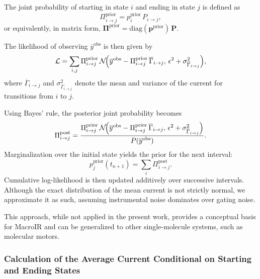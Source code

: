 \documentclass[pdflatex,sn-nature]{sn-jnl}%
\theoremstyle{thmstyleone}%
\theoremstyle{thmstyletwo}%
\theoremstyle{thmstylethree}%
\begin{document}
The joint probability of starting in state \(i\) and ending in state \(j\) is defined as
\begin{equation}
	\Pi_{i\rightarrow j}^{\text{prior}} = p_i^{\text{prior}}\,P_{i\rightarrow j},
	\label{eq:joint_state_probability_short}
\end{equation}
or equivalently, in matrix form, \(\boldsymbol{\Pi}^{\text{prior}} = \mathrm{diag}(\boldsymbol{p}^{\text{prior}})\,\mathbf{P}\).

The likelihood of observing \(\overline{y}^{\text{obs}}\) is then given by
\begin{equation}
	\mathcal{L} = \sum_{i,j} \Pi_{i\rightarrow j}^{\text{prior}}\,\mathcal{N}\!\Bigl(\overline{y}^{\text{obs}} - \Pi_{i\rightarrow j}^{\text{prior}}\,\overline{\Gamma}_{i\rightarrow j},\, \epsilon^2 + \sigma^2_{\overline{\Gamma}_{i\rightarrow j}}\Bigr),
	\label{eq:integrated_likelihood_short}
\end{equation}
where \(\overline{\Gamma}_{i\rightarrow j}\) and \(\sigma^2_{\overline{\Gamma}_{i\rightarrow j}}\) denote the mean and variance of the current for transitions from \(i\) to \(j\).

Using Bayes' rule, the posterior joint probability becomes
\begin{equation}
	\Pi_{i\rightarrow j}^{\text{post}} = \frac{\Pi_{i\rightarrow j}^{\text{prior}}\,\mathcal{N}\!\Bigl(\overline{y}^{\text{obs}} - \Pi_{i\rightarrow j}^{\text{prior}}\,\overline{\Gamma}_{i\rightarrow j},\, \epsilon^2 + \sigma^2_{\overline{\Gamma}_{i\rightarrow j}}\Bigr)}{P(\overline{y}^{\text{obs}})}.
	\label{eq:integrated_posterior_short}
\end{equation}
Marginalization over the initial state yields the prior for the next interval:
\begin{equation}
	p_j^{\text{prior}}(t_{n+1}) = \sum_i \Pi_{i\rightarrow j}^{\text{post}}.
	\label{eq:next_prior_short}
\end{equation}
Cumulative log-likelihood is then updated additively over successive intervals. Although the exact distribution of the mean current is not strictly normal, we approximate it as such, assuming instrumental noise dominates over gating noise.

This approach, while not applied in the present work, provides a conceptual basis for MacroIR and can be generalized to other single-molecule systems, such as molecular motors.


\subsubsection{Calculation of the Average Current Conditional on Starting and Ending States}
\end{document}
